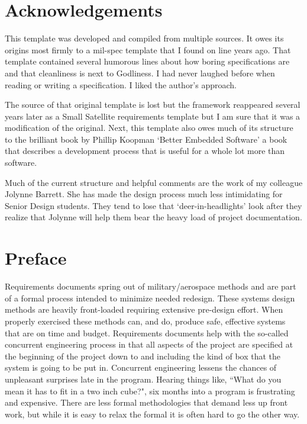 \begin{slshape} \color{blue}
\section*{Acknowledgements}

\bigskip

This template was developed and compiled from multiple sources.  It owes its origins most firmly to a mil-spec template that I found on line years ago.  That template contained several humorous lines about how boring specifications are and that cleanliness is next to Godliness.  I had never laughed before when reading or writing a specification. I liked the author's approach. 
\bigskip 

The source of that original template is lost but the framework reappeared several years later as a Small Satellite requirements template but I am sure that it was a modification of the original.  Next, this template also owes much of its structure to the brilliant book by Phillip Koopman `Better Embedded Software' a book that describes a development process that is useful for a whole lot more than software.  %

\bigskip

Much of the current structure and helpful comments are the work of my colleague Jolynne Barrett.  She has made the design process much less intimidating for Senior Design students.  They tend to lose that `deer-in-headlights' look after they realize that Jolynne will help them bear the heavy load of project documentation.

\newpage

\section*{Preface}

Requirements documents spring out of military/aerospace methods and are part of a formal process intended to minimize needed redesign.  These systems design methods are heavily front-loaded requiring extensive pre-design effort.  When properly exercised these methods can, and do, produce safe, effective systems that are on time and budget.  Requirements documents help with the so-called concurrent engineering process in that all aspects of the project are specified at the beginning of the project down to and including the kind of box that the system is going to be put in.  Concurrent engineering lessens the chances of unpleasant surprises late in the program.  Hearing things like, ``What do you mean it has to fit in a two inch cube?", six months into a program is frustrating and expensive.  There are less formal methodologies that demand less up front work, but while it is easy to relax the formal it is often hard to go the other way.
\bigskip  


\end{slshape}
